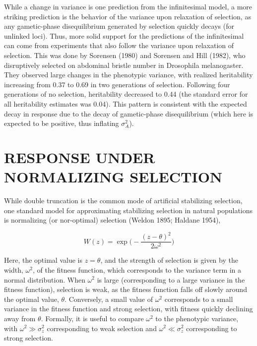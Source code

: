 \documentclass{article}
\begin{document}
While a change in variance is one prediction from the infinitesimal model, a more striking prediction is the behavior of the variance upon relaxation of selection, as any gametic-phase disequilibrium generated by selection quickly decays (for unlinked loci). Thus, more solid support for the predictions of the infinitesimal can come from experiments that also follow the variance upon relaxation of selection. This was done by Sorensen (1980) and Sorensen and Hill (1982), who disruptively selected on abdominal bristle number in Drosophila melanogaster. They observed large changes in the phenotypic variance, with realized heritability increasing from 0.37 to 0.69 in two generations of selection. Following four generations of no selection, heritability decreased to 0.44 (the standard error for all heritability estimates was 0.04). This pattern is consistent with the expected decay in response due to the decay of gametic-phase disequilibrium (which here is expected to be positive, thus inflating  $ \sigma_{A}^{2} $).

\section{RESPONSE UNDER NORMALIZING SELECTION}
While double truncation is the common mode of artificial stabilizing selection, one standard model for approximating stabilizing selection in natural populations is normalizing (or nor-optimal) selection (Weldon 1895; Haldane 1954),

\begin{equation}
W(z)=\exp\Big(-\frac{(z-\theta)^{2}}{2\omega^{2}}\Big)
\tag{16.17}
\label{eq:16_17}
\end{equation}

Here, the optimal value is  $ z = \theta $, and the strength of selection is given by the width,  $ \omega^2 $, of the fitness function, which corresponds to the variance term in a normal distribution. When  $ \omega^2 $ is large (corresponding to a large variance in the fitness function), selection is weak, as the fitness function falls off slowly around the optimal value,  $ \theta $. Conversely, a small value of  $ \omega^2 $ corresponds to a small variance in the fitness function and strong selection, with fitness quickly declining away from  $ \theta $. Formally, it is useful to compare  $ \omega^2 $ to the phenotypic variance, with  $ \omega^2 \gg \sigma_z^2 $ corresponding to weak selection and  $ \omega^2 \ll \sigma_z^2 $ corresponding to strong selection.
\end{document}
